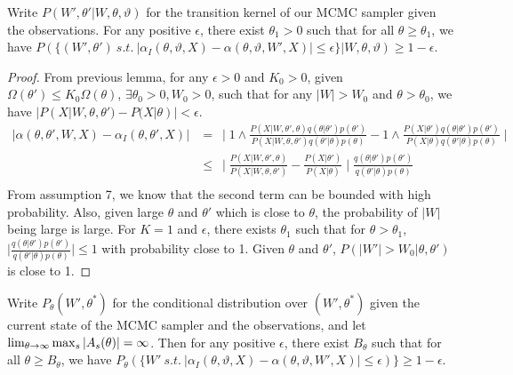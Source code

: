 \begin{proposition}
Write $P(W', \theta' | W, \theta, \vartheta)$ for the transition kernel of our MCMC sampler given the observations. For any positive $\epsilon$, there exist $\theta_1 > 0$ such that for all $\theta \ge \theta_1$, we have
  $P(\{(W', \theta') \ s.t.\ |\alpha_I(\theta,\vartheta,X) - \alpha(\theta,\vartheta,W',X)| 
  \le \epsilon\} | W, \theta, \vartheta) \ge 1-\epsilon$.%
\label{prop:mix0}
\end{proposition}
\begin{proof}
From previous lemma, for any $\epsilon > 0$ and $K_0 > 0$, given $\Omega(\theta') \leq K_0 \Omega(\theta)$, $\exists \theta_0 > 0, W_0 > 0$, such that for any $|W| > W_0$ and $\theta > \theta_0$, we have $|P(X | W, \theta, \theta') - P(X | \theta)| < \epsilon$. 
\begin{align*}
|\alpha(\theta, \theta', W, X) - \alpha_I(\theta, \theta', X)| &= \ \mid 1 \wedge \frac{P(X | W, \theta' , \theta)q(\theta | \theta')p(\theta')}{P(X | W, \theta , \theta')q(\theta' | \theta)p(\theta)} - 1 \wedge \frac{P(X | \theta')q(\theta | \theta')p(\theta')}{P(X | \theta)q(\theta' | \theta)p(\theta)} \mid \\
& \leq \ \mid \frac{P(X | W, \theta' , \theta)}{P(X | W, \theta , \theta')} - \frac{P(X | \theta')}{P(X | \theta)} \mid \frac{q(\theta | \theta')p(\theta')}{q(\theta' | \theta)p(\theta)}\\
\end{align*}
From assumption 7, we know that the second term can be bounded with high probability. Also, given large $\theta$ and $\theta'$ which is close to $\theta$, the probability of $|W|$ being large is large. 
For $K = 1$ and $\epsilon$, there exists $\theta_1$ such that for $\theta > \theta_1$, $\mid \frac{q(\theta | \theta')p(\theta')}{q(\theta' | \theta)p(\theta)}\mid \leq 1$ with probability close to 1. Given $\theta$ and $\theta'$, $P(|W'| > W_0 | \theta, \theta')$ is close to 1.
\end{proof}
\begin{proposition}
  Write $P_{\theta}(W',\theta^*)$ for the conditional distribution 
  over $(W',\theta^*)$ given the current state of the MCMC sampler and the 
  observations, and let
  $\lim_{\theta\rightarrow\infty} {\max_s |A_s(\theta)|} = \infty$. Then for any positive 
  $\epsilon$, there exist $B_\theta$ such that for all 
  $\theta \ge B_\theta$, %
  we have 
  $P_{\theta}(\{W'\ s.t.\ |\alpha_I(\theta,\vartheta,X) - \alpha(\theta,\vartheta,W',X)| 
  \le \epsilon)\} \ge 1-\epsilon$.%
\label{prop:mix}
\end{proposition}
